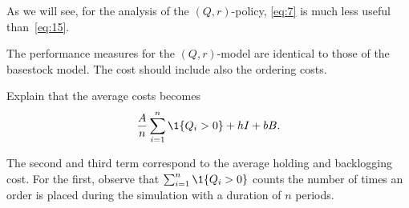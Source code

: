 As we will see, for the  analysis  of the $(Q,r)$-policy, \eqref{eq:7} is much less useful than~\eqref{eq:15}. 

The performance measures for the $(Q,r)$-model are identical to those of the basestock model. The cost should include also the ordering costs. 

\begin{exercise}
  Explain that the average costs becomes
  \begin{equation*}
    \frac A  n \sum_{i=1}^n \1{Q_i > 0} + h I + b B.
  \end{equation*}
  \begin{solution}
    The second and third term correspond to the average holding and backlogging cost. For the first, observe that $\sum_{i=1}^n \1{Q_i>0}$ counts the number of times an order is placed during the simulation with a duration of $n$  periods. 
  \end{solution}
\end{exercise}

\begin{comment}
If you were to plot the inventory positions as a set of points, see Figure~\ref{fig:qr_demand} then
\begin{itemize}
\item $\IP_t$ becomes  the point $(t-1+\epsilon, \IP_t)$, 
\item $IP_t'$ becomes the point $(t-\epsilon, IP_t')$
\item $D_t$  becomes the point $(t-1/2, D_t)$
\item $Q_t$  becomes the point $(t, Q_t)$.
\end{itemize}

\begin{figure}[htbp]
  \centering
  \begin{tabular}[h]{cc}
\\
\\
  \end{tabular}
  \caption{Upper panel: Behavior of $\IP_t$ and $\IP_t'$ as functions of time. Lower panel: a graph of the inventory level $\IL_t$. Observe in the lower panel that the replenishments arrive $L=3$ periods later.}
\label{fig:qr_demand}
\end{figure}
\end{comment}

\begin{comment}
  \begin{enumerate}
  \item   Exercises on systems with loss
  \item graphical `proof' of insensitivity of cost on Q and r around the minimum.
  \end{enumerate}
\end{comment}

